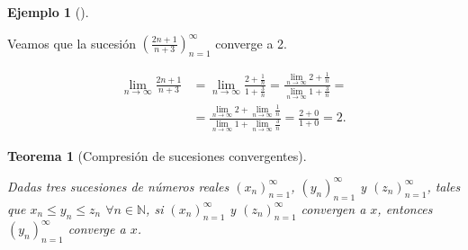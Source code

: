 \documentclass[
  a4paper,
]{scrreport}
\theoremstyle{definition}
\newtheorem{example}{Ejemplo}[chapter]
\theoremstyle{plain}
\theoremstyle{definition}
\theoremstyle{plain}
\newtheorem{theorem}{Teorema}[chapter]
\theoremstyle{plain}
\theoremstyle{remark}
\begin{document}
\leavevmode{}%
\begin{example}[]\label{exm-algebra-limites-sucesiones}

Veamos que la sucesión \(\left(\frac{2n+1}{n+3}\right)_{n=1}^\infty\)
converge a 2.

\begin{align*}
\lim_{n\to\infty}\frac{2n+1}{n+3} &=  \lim_{n\to\infty}\frac{2+\frac{1}{n}}{1+\frac{3}{n}} = \frac{\lim_{n\to\infty}2+\frac{1}{n}}{\lim_{n\to\infty}1+\frac{3}{n}} = \\ 
&=\frac{\lim_{n\to\infty} 2 + \lim_{n\to\infty}\frac{1}{n}}{\lim_{n\to\infty} 1 + \lim_{n\to\infty}\frac{3}{n}} = \frac{2+0}{1+0} = 2.
\end{align*}

\end{example}

\leavevmode{}%
\begin{theorem}[Compresión de sucesiones
convergentes]\label{thm-compresion-sucesiones-convergentes}

Dadas tres sucesiones de números reales \((x_n)_{n=1}^\infty\),
\((y_n)_{n=1}^\infty\) y \((z_n)_{n=1}^\infty\), tales que
\(x_n\leq y_n\leq z_n\) \(\forall n\in\mathbb{N}\), si
\((x_n)_{n=1}^\infty\) y \((z_n)_{n=1}^\infty\) convergen a \(x\),
entonces \((y_n)_{n=1}^\infty\) converge a \(x\).

\end{theorem}
\end{document}
